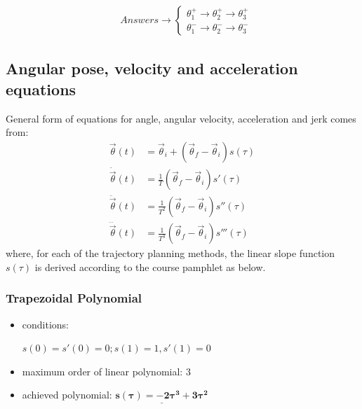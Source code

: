 \documentclass[conference]{IEEEtran}
\begin{document}
\begin{large}
    \begin{align*}
         & Answers \longrightarrow
        \begin{cases}
            \theta_1 ^+ \longrightarrow\theta_2 ^+ \longrightarrow \theta_3 ^+ \\[30pt]
            \theta_1 ^- \longrightarrow\theta_2 ^- \longrightarrow \theta_3 ^-
        \end{cases}
    \end{align*}
\end{large}

\subsection{Angular pose, velocity and acceleration equations}
General form of equations for angle, angular velocity, acceleration and jerk comes from:
\begin{align}
    \vec{\theta}(t)         & = \vec{\theta}_i + \left(\vec{\theta}_f - \vec{\theta}_i\right) s(\tau) \label{eq:angle} \\
    \dot{\vec{\theta}}(t)   & = \frac{1}{T} \left(\vec{\theta}_f - \vec{\theta}_i\right) s'(\tau)                      \\
    \ddot{\vec{\theta}}(t)  & = \frac{1}{T^2} \left(\vec{\theta}_f - \vec{\theta}_i\right) s''(\tau)                   \\
    \dddot{\vec{\theta}}(t) & = \frac{1}{T^3} \left(\vec{\theta}_f - \vec{\theta}_i\right) s'''(\tau)
\end{align}
where, for each of the trajectory planning methods, the linear slope function $s(\tau)$ is derived according to the course pamphlet as below.
\vspace{3px}

\subsubsection{\textbf{Trapezoidal Polynomial}}
\begin{itemize}
    \item conditions: \begin{footnotesize}
              \(s(0) = s'(0) = 0; s(1) = 1, s'(1) = 0\)
          \end{footnotesize}
    \item maximum order of linear polynomial: 3
    \item achieved polynomial: \(\underline{\mathbf{s(\tau) = - 2\tau^3 + 3\tau^2}}\)
\end{itemize}
\end{document}
